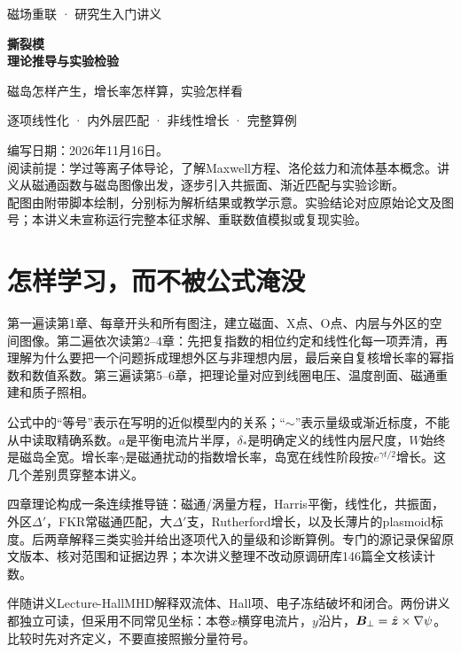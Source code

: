 \documentclass[UTF8,a4paper,11pt,openany,fontset=fandol]{ctexbook}
\begin{document}
\frontmatter
\begin{titlepage}
\vspace*{20mm}
{\sffamily\Large 磁场重联 · 研究生入门讲义\par}
\vspace{15mm}
{\sffamily\Huge\bfseries\color{ink}撕裂模\\[8pt]理论推导与实验检验\par}
\vspace{14mm}
{\Large 磁岛怎样产生，增长率怎样算，实验怎样看\par}
\vspace{12mm}
{\large 逐项线性化 · 内外层匹配 · 非线性增长 · 完整算例\par}
\vfill
编写日期：2026年11月16日。\\[8pt]
阅读前提：学过等离子体导论，了解Maxwell方程、洛伦兹力和流体基本概念。讲义从磁通函数与磁岛图像出发，逐步引入共振面、渐近匹配与实验诊断。\\[8pt]
配图由附带脚本绘制，分别标为解析结果或教学示意。实验结论对应原始论文及图号；本讲义未宣称运行完整本征求解、重联数值模拟或复现实验。
\end{titlepage}
\chapter*{怎样学习，而不被公式淹没}
第一遍读第1章、每章开头和所有图注，建立磁面、X点、O点、内层与外区的空间图像。第二遍依次读第2--4章：先把复指数的相位约定和线性化每一项弄清，再理解为什么要把一个问题拆成理想外区与非理想内层，最后亲自复核增长率的幂指数和数值系数。第三遍读第5--6章，把理论量对应到线圈电压、温度剖面、磁通重建和质子照相。

公式中的“等号”表示在写明的近似模型内的关系；“$\sim$”表示量级或渐近标度，不能从中读取精确系数。$a$是平衡电流片半厚，$\delta_*$是明确定义的线性内层尺度，$W$始终是磁岛全宽。增长率$\gamma$是磁通扰动的指数增长率，岛宽在线性阶段按$e^{\gamma t/2}$增长。这几个差别贯穿整本讲义。

四章理论构成一条连续推导链：磁通/涡量方程，Harris平衡，线性化，共振面，外区$\Delta'$，FKR常磁通匹配，大$\Delta'$支，Rutherford增长，以及长薄片的plasmoid标度。后两章解释三类实验并给出逐项代入的量级和诊断算例。专门的源记录保留原文版本、核对范围和证据边界；本次讲义整理不改动原调研库146篇全文核读计数。

伴随讲义Lecture-HallMHD解释双流体、Hall项、电子冻结破坏和闭合。两份讲义都独立可读，但采用不同常见坐标：本卷$x$横穿电流片，$y$沿片，$\bm{B}_\perp=\hat{\bm{z}}\times\nabla\psi$。比较时先对齐定义，不要直接照搬分量符号。
\setcounter{tocdepth}{1}\tableofcontents\listoffigures
\mainmatter






\backmatter\begingroup\small\setlength{\bibsep}{3pt}\endgroup
\end{document}
